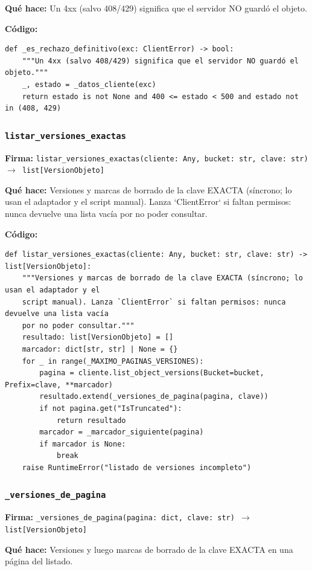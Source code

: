 \documentclass[11pt,a4paper]{article}
\begin{document}
\textbf{Qué hace:} Un 4xx (salvo 408/429) significa que el servidor NO guardó el objeto.

\textbf{Código:}
\begin{lstlisting}
def _es_rechazo_definitivo(exc: ClientError) -> bool:
    """Un 4xx (salvo 408/429) significa que el servidor NO guardó el objeto."""
    _, estado = _datos_cliente(exc)
    return estado is not None and 400 <= estado < 500 and estado not in (408, 429)
\end{lstlisting}

\subsubsection*{\texttt{listar\_versiones\_exactas}}
\textbf{Firma:} \texttt{listar\_versiones\_exactas(cliente: Any, bucket: str, clave: str) $\rightarrow$ list[VersionObjeto]}

\textbf{Qué hace:} Versiones y marcas de borrado de la clave EXACTA (síncrono; lo usan el adaptador y el
script manual). Lanza `ClientError` si faltan permisos: nunca devuelve una lista vacía
por no poder consultar.

\textbf{Código:}
\begin{lstlisting}
def listar_versiones_exactas(cliente: Any, bucket: str, clave: str) -> list[VersionObjeto]:
    """Versiones y marcas de borrado de la clave EXACTA (síncrono; lo usan el adaptador y el
    script manual). Lanza `ClientError` si faltan permisos: nunca devuelve una lista vacía
    por no poder consultar."""
    resultado: list[VersionObjeto] = []
    marcador: dict[str, str] | None = {}
    for _ in range(_MAXIMO_PAGINAS_VERSIONES):
        pagina = cliente.list_object_versions(Bucket=bucket, Prefix=clave, **marcador)
        resultado.extend(_versiones_de_pagina(pagina, clave))
        if not pagina.get("IsTruncated"):
            return resultado
        marcador = _marcador_siguiente(pagina)
        if marcador is None:
            break
    raise RuntimeError("listado de versiones incompleto")
\end{lstlisting}

\subsubsection*{\texttt{\_versiones\_de\_pagina}}
\textbf{Firma:} \texttt{\_versiones\_de\_pagina(pagina: dict, clave: str) $\rightarrow$ list[VersionObjeto]}

\textbf{Qué hace:} Versiones y luego marcas de borrado de la clave EXACTA en una página del listado.
\end{document}

